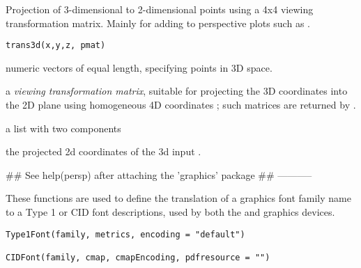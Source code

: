 %
\begin{Description}\relax
Projection of 3-dimensional to 2-dimensional points using a 4x4
viewing transformation matrix.  Mainly for adding to
perspective plots such as .
\end{Description}
%
\begin{Usage}
\begin{verbatim}
trans3d(x,y,z, pmat)
\end{verbatim}
\end{Usage}
%
\begin{Arguments}
\begin{ldescription}
\item[\code{x, y, z}] numeric vectors of equal length, specifying points in
3D space.
\item[\code{pmat}] a  \emph{viewing transformation matrix},
suitable for projecting the 3D coordinates  into the 2D
plane using homogeneous 4D coordinates ;
such matrices are returned by .
\end{ldescription}
\end{Arguments}
%
\begin{Value}
a list with two components
\begin{ldescription}
\item[\code{x,y}] the projected 2d coordinates of the 3d input .
\end{ldescription}
\end{Value}
%
\begin{SeeAlso}\relax
\end{SeeAlso}
%
\begin{Examples}
\begin{ExampleCode}

## See  help(persp) {after attaching the 'graphics' package}
##      -----------
\end{ExampleCode}
\end{Examples}
%
\begin{Description}\relax
These functions are used to define the translation of a \R{} graphics
font family name to a Type 1 or CID font descriptions, used by both
the  and  graphics devices.
\end{Description}
%
\begin{Usage}
\begin{verbatim}
Type1Font(family, metrics, encoding = "default")

CIDFont(family, cmap, cmapEncoding, pdfresource = "")
\end{verbatim}
\end{Usage}

